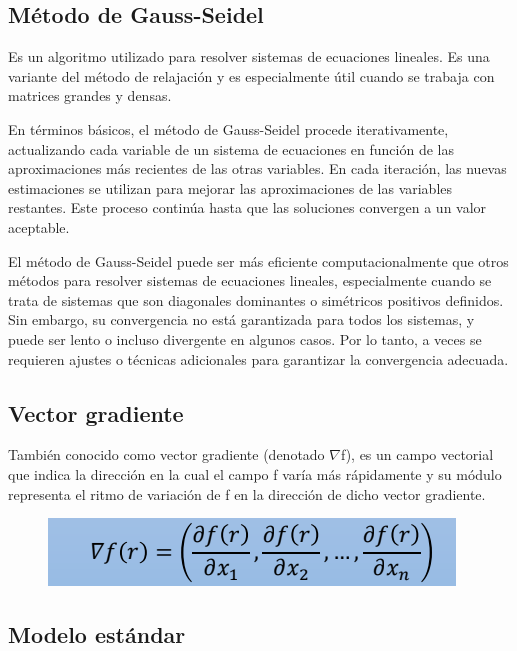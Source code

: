 \documentclass[conference]{IEEEtran}
\begin{document}
\subsection{Método de Gauss-Seidel}

Es un algoritmo utilizado para resolver sistemas de ecuaciones lineales. Es
una variante del método de relajación y es especialmente útil cuando se
trabaja con matrices grandes y densas.

En términos básicos, el método de Gauss-Seidel procede iterativamente,
actualizando cada variable de un sistema de ecuaciones en función de las
aproximaciones más recientes de las otras variables. En cada iteración, las
nuevas estimaciones se utilizan para mejorar las aproximaciones de las
variables restantes. Este proceso continúa hasta que las soluciones convergen
a un valor aceptable.

El método de Gauss-Seidel puede ser más eficiente computacionalmente que
otros métodos para resolver sistemas de ecuaciones lineales, especialmente
cuando se trata de sistemas que son diagonales dominantes o simétricos
positivos definidos. Sin embargo, su convergencia no está garantizada para
todos los sistemas, y puede ser lento o incluso divergente en algunos casos.
Por lo tanto, a veces se requieren ajustes o técnicas adicionales para
garantizar la convergencia adecuada.

\subsection{Vector gradiente}

También conocido como vector gradiente (denotado $\nabla$f), es un
campo vectorial que indica la dirección en la cual el campo f varía más
rápidamente y su módulo representa el ritmo de variación de f en la dirección
de dicho vector gradiente.

\begin{figure}[H]
    \begin{center}
        \includegraphics[width=\linewidth]{./Images/VectorGradiente.png}
        \caption{}
    \end{center}
\end{figure}

\subsection{Modelo estándar}
\end{document}
